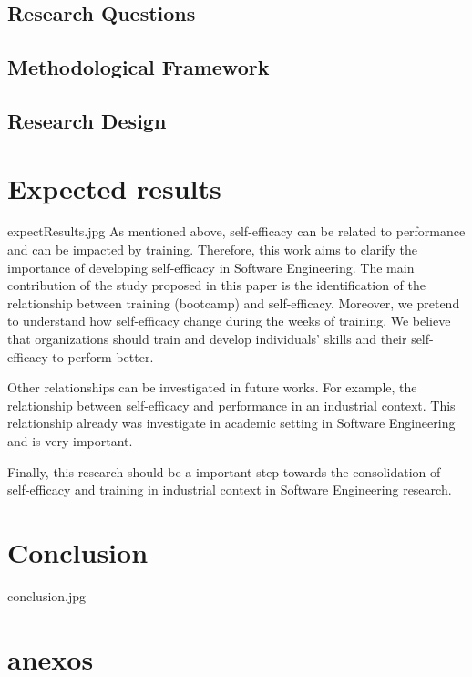 \documentclass{TheMartianReport}
\begin{document}
\subsection{Research Questions} 
\lipsum[500]

\subsection{Methodological Framework} 
\lipsum[500]

\subsection{Research Design} 
\lipsum[500]


\section{Expected results}{expectResults.jpg}
As mentioned above, self-efficacy can be related to performance and can be impacted by training. Therefore, this work aims to clarify the importance of developing self-efficacy in Software Engineering. 
The main contribution of the study proposed in this paper is the identification of the relationship between training (bootcamp) and self-efficacy. Moreover, we pretend to understand how self-efficacy change during the weeks of training.  We believe that organizations should train and develop individuals' skills and their self-efficacy to perform better. 

Other relationships can be investigated in future works. For example, the relationship between self-efficacy and performance in an industrial context.  This relationship already was investigate in academic setting \cite{davazdahemami2018training} in Software Engineering and is very important. 

Finally, this research should be a important step towards the consolidation of self-efficacy and training in industrial context in Software Engineering research.



\section{Conclusion}{conclusion.jpg}
\lipsum[500]



\section{anexos}
\end{document}
